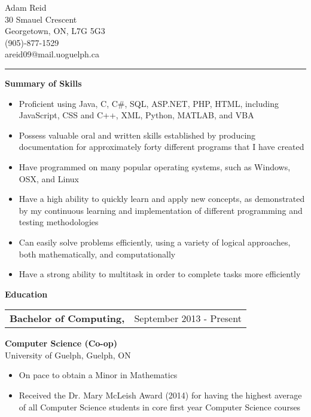 \documentclass[12pt]{article}
\begin{document}
{\huge Adam Reid}\\
30 Smauel Crescent\\
Georgetown, ON, L7G 5G3\\
(905)-877-1529\\
areid09@mail.uoguelph.ca\\
\noindent\rule{6in}{0.4pt}

\vspace{12pt}

\textbf{Summary of Skills}

\vspace{12pt}

{ 
  \small
  \begin{itemize}
    \item Proficient using Java, C, C\#, SQL, ASP.NET, PHP, HTML, including JavaScript, CSS and C++, XML, Python, MATLAB, and VBA
    \item Possess valuable oral and written skills established by producing documentation for approximately forty different programs that I have created
    \item Have programmed on many popular operating systems, such as Windows, OSX, and Linux
    \item Have a high ability to quickly learn and apply new concepts, as demonstrated by my continuous learning and implementation of different programming and testing methodologies
    \item Can easily solve problems efficiently, using a variety of logical approaches, both mathematically, and computationally
    \item Have a strong ability to multitask in order to complete tasks more efficiently
  \end{itemize}
}

\vspace{12pt}

\textbf{Education}

\vspace{12pt}

{
  \small
  \noindent\begin{tabu} {@{} X[l] X[r]}
    \textbf{Bachelor of Computing,} & September 2013 - Present
  \end{tabu}
  \textbf{Computer Science (Co-op)}\\
  University of Guelph, Guelph, ON
  \begin{itemize}
    \item On pace to obtain a Minor in Mathematics
    \item Received the Dr. Mary McLeish Award (2014) for having the highest average of all Computer Science students in core first year Computer Science courses
  \end{itemize}
}
\end{document}
